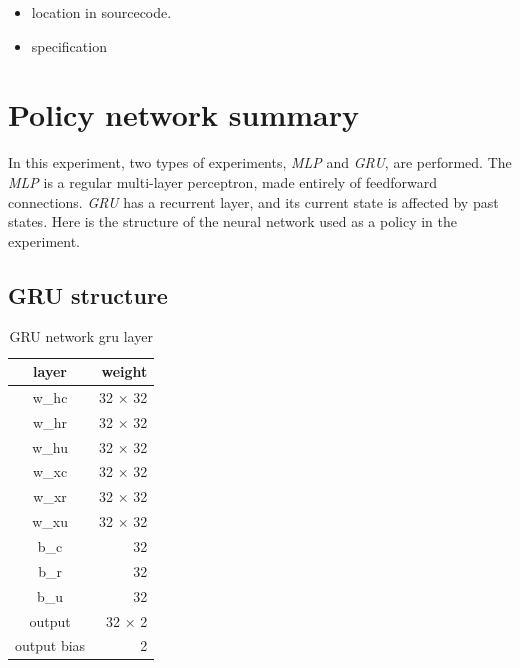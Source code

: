 \begin{itemize}
\item location in sourcecode.
\item specification
\end{itemize}


\section{Policy network summary}

In this experiment, two types of experiments, {\it MLP} and {\it GRU}, are performed. The {\it MLP} is a regular multi-layer perceptron, made entirely of feedforward connections. {\it GRU} has a recurrent layer, and its current state is affected by past states. Here is the structure of the neural network used as a policy in the experiment.





\subsection{GRU structure}


\begin{table}[H]
\centering
\begin{tabular}{|c|r|}
\hline 
layer  & weight    \\ \hline \hline
w\_hc  & 32 $\times$ 32   \\
w\_hr  & 32 $\times$ 32   \\
w\_hu  & 32 $\times$ 32   \\
w\_xc  & 32 $\times$ 32   \\
w\_xr  & 32 $\times$ 32   \\
w\_xu  & 32 $\times$ 32   \\
b\_c  & 32   \\
b\_r  & 32   \\
b\_u  & 32   \\
output & 32 $\times$ 2   \\
output bias & 2   \\
\hline
\end{tabular} 
\caption{GRU network gru layer}
\label{tab:reward_gru_gru_network}
\end{table}

